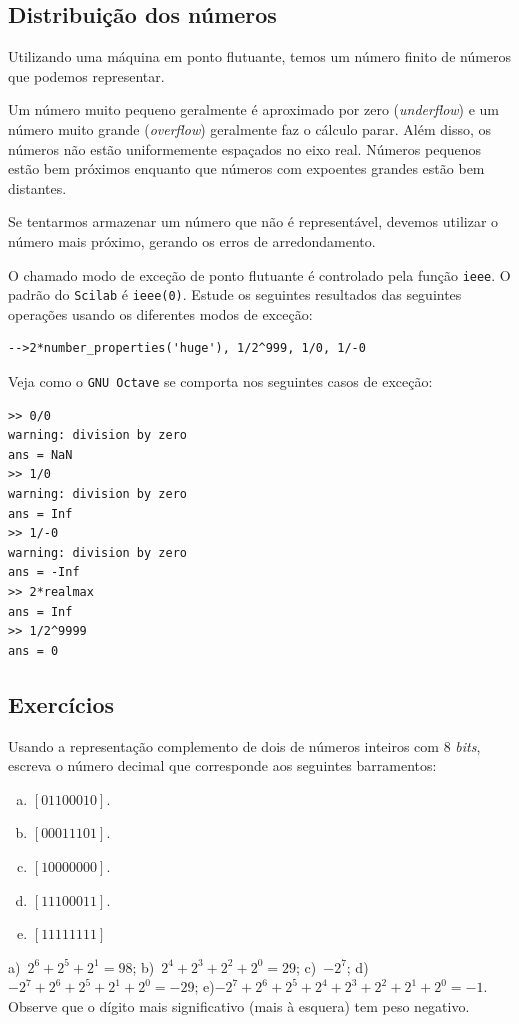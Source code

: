 \subsection{Distribuição dos números}
Utilizando uma máquina em ponto flutuante, temos um número finito de números que podemos representar.

Um número muito pequeno geralmente é aproximado por zero (\emph{underflow}) e um número muito grande (\emph{overflow}) geralmente faz o cálculo parar. Além disso, os números não estão uniformemente espaçados no eixo real. Números pequenos estão bem próximos enquanto que números com expoentes grandes estão bem distantes.

Se tentarmos armazenar um número que não é representável, devemos utilizar o número mais próximo, gerando os erros de arredondamento.

\ifisscilab
\begin{obs}
  O chamado modo de exceção de ponto flutuante é controlado pela função \verb+ieee+. O padrão do \verb+Scilab+ é \verb+ieee(0)+. Estude os seguintes resultados das seguintes operações usando os diferentes modos de exceção:
\begin{verbatim}
-->2*number_properties('huge'), 1/2^999, 1/0, 1/-0
\end{verbatim}
\end{obs}
\fi
\ifisoctave
\begin{obs}
  Veja como o \verb+GNU Octave+ se comporta nos seguintes casos de exceção:
\begin{verbatim}
>> 0/0
warning: division by zero
ans = NaN
>> 1/0
warning: division by zero
ans = Inf
>> 1/-0
warning: division by zero
ans = -Inf
>> 2*realmax
ans = Inf
>> 1/2^9999
ans = 0
\end{verbatim}
\end{obs}
\fi

\subsection*{Exercícios}

\begin{exer}
  Usando a representação complemento de dois de números inteiros com $8$ \emph{bits}, escreva o número decimal que corresponde aos seguintes barramentos:
  \begin{enumerate}[a)]
  \item $[01100010]$.
  \item $[00011101]$.
  \item $[10000000]$.
  \item $[11100011]$.
  \item $[11111111]$
   \end{enumerate}
\end{exer}
\begin{resp}
  a)~$2^6+2^5+2^1=98$; b)~$2^4+2^3+2^2+2^0=29$; c)~$-2^7$; d)~$-2^7+2^6+2^5+2^1+2^0=-29$; e)$-2^7+2^6+2^5+2^4+2^3+2^2+2^1+2^0=-1$.
  Observe que o dígito mais significativo (mais à esquera) tem peso negativo.
\end{resp}

